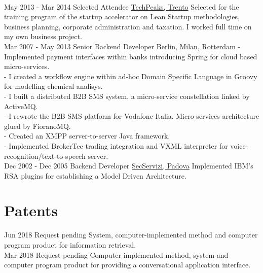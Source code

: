 \documentclass[letterpaper]{twentysecondcv} %
\begin{document}
\begin{twenty}
{{    }
        }
     \\
     \twentyitem
   		{May 2013 -}
		{Mar 2014}
        {Selected Attendee}
        {\href{https://www.repubblica.it/rubriche/startup-stories/2013/12/02/news/incubatore_startup-72502909/}{TechPeaks, Trento}}
        {}
        {
Selected for the training program of the startup accelerator on Lean Startup methodologies, business planning, corporate administration and taxation. I worked full time on my own business project.
    	}
    	\\
     \twentyitem
   		{Mar 2007 -}
		{May 2013}
        {Senior Backend Developer}
        {\href{}{Berlin, Milan, Rotterdam}}
        {}
        {
- Implemented payment interfaces within banks introducing Spring for cloud based micro-services.
        \\
- I created a workflow engine within ad-hoc Domain Specific Language in Groovy for modelling chemical analisys.
        \\
- I built a distributed B2B SMS system, a micro-service constellation linked by ActiveMQ.
        \\
- I rewrote the B2B SMS platform for Vodafone Italia. Micro-services architecture glued by FioranoMQ.
        \\
- Created an XMPP server-to-server Java framework.
        \\
- Implemented BrokerTec trading integration and VXML interpreter for  voice-recognition/text-to-speech server.
	}
   	\\
     \twentyitem
   		{Dec 2002 -}
		{Dec 2005}
        {Backend Developer}
        {\href{}{SecServizi, Padova}}
        {}
        {
    Implemented IBM's RSA plugins for establishing a Model Driven Architecture.
       	}
        
\end{twenty}

\section{Patents}
\begin{twenty}
\twentyitem
	{Jun 2018}
	{}
	{}
	{Request pending}	
	{
System, computer-implemented method and computer program product for information retrieval.
}{}
\\
\twentyitem
	{Mar 2018}
	{}
	{}
	{Request pending}	
	{
Computer-implemented method, system and computer program product for providing a conversational application interface.
}{}
\end{twenty}
\end{document}
